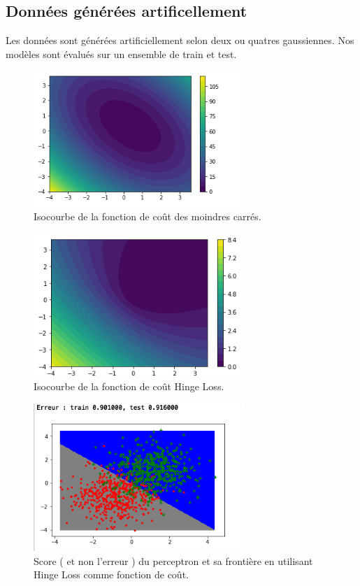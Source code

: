 \documentclass{article}
\begin{document}
\subsection{Données générées artificellement}
Les données sont générées artificiellement selon deux ou quatres gaussiennes. Nos modèles sont évalués sur un ensemble de train et test.\\
\begin{figure}[h]
	\center
	\includegraphics[width=8cm]{figure/tme4_5/mse.png} 
	 \caption{Isocourbe de la fonction de coût des moindres carrés. }
	 
\end{figure}
\begin{figure}[h]
	\center
	\includegraphics[width=8cm]{figure/tme4_5/hinge_loss.png} 
	 \caption{Isocourbe de la fonction de coût Hinge Loss. }
	 
\end{figure}
\begin{figure}[h]
	\center
	\includegraphics[width=8cm]{figure/tme4_5/borderHL.png} 
	 \caption{Score ( et non l'erreur ) du perceptron et sa frontière en utilisant Hinge Loss comme fonction de coût. }
	 
\end{figure}
\end{document}

